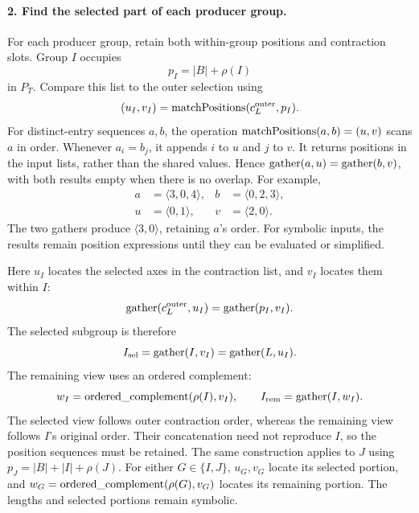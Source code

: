 \paragraph{2. Find the selected part of each producer group.}
For each producer group, retain both within-group positions and contraction
slots. Group $I$ occupies
\begin{equation}
 p_I=|B|+\rho(I)
\end{equation}
in $P_T$. Compare this list to the outer selection using
\begin{equation}
 (u_I,v_I)=\operatorname{matchPositions}(c_L^{\mathrm{outer}},p_I).
\end{equation}
For distinct-entry sequences $a,b$, the operation
$\operatorname{matchPositions}(a,b)=(u,v)$ scans $a$ in order. Whenever $a_i=b_j$, it appends $i$ to
$u$ and $j$ to $v$. It returns positions in the input lists, rather than
the shared values. Hence $\operatorname{gather}(a,u)=\operatorname{gather}(b,v)$, with both results empty
when there is no overlap. For example,
\begin{equation}
\begin{aligned}
 a&=\langle3,0,4\rangle,&b&=\langle0,2,3\rangle,\\
 u&=\langle0,1\rangle,&v&=\langle2,0\rangle.
\end{aligned}
\end{equation}
The two gathers produce $\langle3,0\rangle$, retaining $a$'s order.
For symbolic inputs, the results remain position expressions until they can
be evaluated or simplified.

Here $u_I$ locates the selected axes in the contraction list, and $v_I$
locates them within $I$:
\begin{equation}
 \operatorname{gather}(c_L^{\mathrm{outer}},u_I)=\operatorname{gather}(p_I,v_I).
\end{equation}
The selected subgroup is therefore
\begin{equation}
 I_{\mathrm{sel}}=\operatorname{gather}(I,v_I)=\operatorname{gather}(L,u_I).
\end{equation}
The remaining view uses an ordered complement:
\begin{equation}
 w_I=\operatorname{ordered\_complement}(\rho(I),v_I),\qquad I_{\mathrm{rem}}=\operatorname{gather}(I,w_I).
\end{equation}
The selected view follows outer contraction order, whereas the remaining
view follows $I$'s original order. Their concatenation need not reproduce
$I$, so the position sequences must be retained. The same construction
applies to $J$ using $p_J=|B|+|I|+\rho(J)$. For either $G\in\{I,J\}$,
$u_G,v_G$ locate its selected portion, and
$w_G=\operatorname{ordered\_complement}(\rho(G),v_G)$ locates its remaining portion. The lengths and
selected portions remain symbolic.

